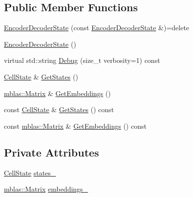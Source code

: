 \subsection*{Public Member Functions}
\begin{DoxyCompactItemize}
\item 
\hyperlink{classamunmt_1_1GPU_1_1EncoderDecoderState_a39e80f702f6a7d1637035e69e488cd93}{Encoder\+Decoder\+State} (const \hyperlink{classamunmt_1_1GPU_1_1EncoderDecoderState}{Encoder\+Decoder\+State} \&)=delete
\item 
\hyperlink{classamunmt_1_1GPU_1_1EncoderDecoderState_a957d5c5780a22dee5a63d81c2cce3cce}{Encoder\+Decoder\+State} ()
\item 
virtual std\+::string \hyperlink{classamunmt_1_1GPU_1_1EncoderDecoderState_abeda49382f75853e64b2085a29f7aba7}{Debug} (size\+\_\+t verbosity=1) const 
\item 
\hyperlink{structamunmt_1_1GPU_1_1CellState}{Cell\+State} \& \hyperlink{classamunmt_1_1GPU_1_1EncoderDecoderState_a6fa32359597fa1c3275c0a7db1ddccd4}{Get\+States} ()
\item 
\hyperlink{namespaceamunmt_1_1GPU_1_1mblas_ab67821a8254de53e45a623cf73c0aef6}{mblas\+::\+Matrix} \& \hyperlink{classamunmt_1_1GPU_1_1EncoderDecoderState_ab08242f46ad02f63ac5442d6ce589af5}{Get\+Embeddings} ()
\item 
const \hyperlink{structamunmt_1_1GPU_1_1CellState}{Cell\+State} \& \hyperlink{classamunmt_1_1GPU_1_1EncoderDecoderState_aa22bedc6b2783410cc27fb948ad2abd5}{Get\+States} () const 
\item 
const \hyperlink{namespaceamunmt_1_1GPU_1_1mblas_ab67821a8254de53e45a623cf73c0aef6}{mblas\+::\+Matrix} \& \hyperlink{classamunmt_1_1GPU_1_1EncoderDecoderState_aac6d9832a63050423c573e2dbae9a24e}{Get\+Embeddings} () const 
\end{DoxyCompactItemize}
\subsection*{Private Attributes}
\begin{DoxyCompactItemize}
\item 
\hyperlink{structamunmt_1_1GPU_1_1CellState}{Cell\+State} \hyperlink{classamunmt_1_1GPU_1_1EncoderDecoderState_a52459847b8f5d70ed4432d0839d35892}{states\+\_\+}
\item 
\hyperlink{namespaceamunmt_1_1GPU_1_1mblas_ab67821a8254de53e45a623cf73c0aef6}{mblas\+::\+Matrix} \hyperlink{classamunmt_1_1GPU_1_1EncoderDecoderState_ad5194d83c537976e776997f73ac75638}{embeddings\+\_\+}
\end{DoxyCompactItemize}


